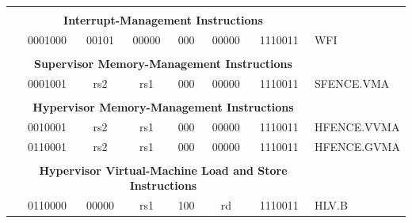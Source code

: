 \documentclass{../runikraft-report}
\begin{document}
{\begin{longtable}{p{0in}p{0.4in}p{0.05in}p{0.05in}p{0.05in}p{0.05in}p{0.4in}p{0.6in}p{0.4in}p{0.6in}p{0.7in}l}
    &
    \multicolumn{10}{c}{} & \\
    &
    \multicolumn{10}{c}{\bf Interrupt-Management Instructions} & \\
    \cline{2-11}


    &
    \multicolumn{4}{|c|}{0001000} &
    \multicolumn{2}{c|}{00101} &
    \multicolumn{1}{c|}{00000} &
    \multicolumn{1}{c|}{000} &
    \multicolumn{1}{c|}{00000} &
    \multicolumn{1}{c|}{1110011} & WFI \\
    \cline{2-11}


    &
    \multicolumn{10}{c}{} & \\
    &
    \multicolumn{10}{c}{\bf Supervisor Memory-Management Instructions} & \\
    \cline{2-11}


    &
    \multicolumn{4}{|c|}{0001001} &
    \multicolumn{2}{c|}{rs2} &
    \multicolumn{1}{c|}{rs1} &
    \multicolumn{1}{c|}{000} &
    \multicolumn{1}{c|}{00000} &
    \multicolumn{1}{c|}{1110011} & SFENCE.VMA \\
    \cline{2-11}


    &
    \multicolumn{10}{c}{} & \\
    &
    \multicolumn{10}{c}{\bf Hypervisor Memory-Management Instructions} & \\
    \cline{2-11}


    &
    \multicolumn{4}{|c|}{0010001} &
    \multicolumn{2}{c|}{rs2} &
    \multicolumn{1}{c|}{rs1} &
    \multicolumn{1}{c|}{000} &
    \multicolumn{1}{c|}{00000} &
    \multicolumn{1}{c|}{1110011} & HFENCE.VVMA \\
    \cline{2-11}


    &
    \multicolumn{4}{|c|}{0110001} &
    \multicolumn{2}{c|}{rs2} &
    \multicolumn{1}{c|}{rs1} &
    \multicolumn{1}{c|}{000} &
    \multicolumn{1}{c|}{00000} &
    \multicolumn{1}{c|}{1110011} & HFENCE.GVMA \\
    \cline{2-11}


    &
    \multicolumn{10}{c}{} & \\
    &
    \multicolumn{10}{c}{\bf Hypervisor Virtual-Machine Load and Store Instructions} & \\
    \cline{2-11}


    &
    \multicolumn{4}{|c|}{0110000} &
    \multicolumn{2}{c|}{00000} &
    \multicolumn{1}{c|}{rs1} &
    \multicolumn{1}{c|}{100} &
    \multicolumn{1}{c|}{rd} &
    \multicolumn{1}{c|}{1110011} & HLV.B \\
    \cline{2-11}



\end{longtable}}
\end{document}
